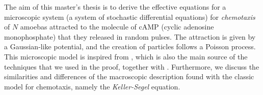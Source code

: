 The aim of this master's thesis is to derive the effective equations for a microscopic system (a system of stochastic differential equations) for \emph{chemotaxis} of $N$ amoebas attracted to the molecule of cAMP (cyclic adenosine monophosphate) that they released in random pulses.
The attraction is given by a Gaussian-like potential, and the creation of particles follows a Poisson process.
This microscopic model is inspired from \cite{ana}, which is also the main source of the techniques that we used in the proof, together with \cite{peter-boers}.
Furthermore, we discuss the similarities and differences of the macroscopic description found with the classic model for chemotaxis, namely the \emph{Keller-Segel} equation.